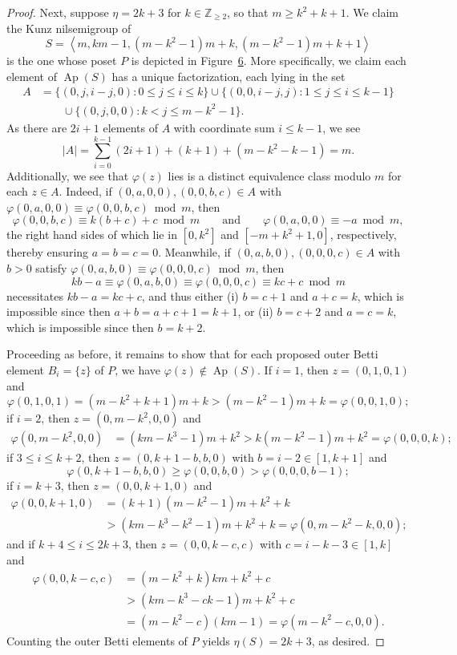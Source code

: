 \documentclass[10pt,a4paper]{amsart}
\newcommand\ZZ{\mathbb{Z}}
\DeclareMathOperator\Ap{Ap}
\begin{document}
\begin{proof}
Next, suppose $\eta = 2k+3$ for $k \in \ZZ_{\ge 2}$, so that $m \ge k^2+k+1$.  We claim the Kunz nilsemigroup of $$S = \left\langle m, km - 1,   (m - k^2-1)m +  k, (m - k^2 -1)m +  k+1\right\rangle$$ is the one whose poset $P$ is depicted in Figure~\href{https://alco.centre-mersenne.org/articles/10.5802/alco.354/}{6}. More specifically, we claim each element of $\Ap(S)$ has a unique factorization, each lying in the set 
\begin{align*}
A &= \{(0, j, i-j, 0) : 0 \le j \le i \le k\}
\cup \{(0, 0, i-j, j): 1 \le j \le i \le k-1\} \\
& \qquad \cup \{(0, j, 0, 0) : k < j \le m - k^2 -1\}.
\end{align*}
As there are $2i+1$ elements of $A$ with coordinate sum $i \leq k-1$, we see
$$|A| = \sum_{i=0}^{k-1} (2i+1) + (k + 1) + (m-k^2-k - 1) = m.$$ Additionally, we see that $\varphi(z)$ lies is a distinct equivalence class modulo $m$ for each $z \in A$. Indeed, if $(0,a,0,0), (0,0,b,c) \in A$ with $\varphi(0,a,0,0) \equiv \varphi(0,0,b,c) \bmod m$, then 
$$\varphi(0,0,b,c) \equiv k(b + c) + c \bmod m
\qquad \text{and} \qquad
\varphi(0,a,0,0) \equiv -a \bmod m,$$
the right hand sides of which lie in $[0, k^2]$ and $[-m + k^2 + 1, 0]$, respectively, thereby ensuring $a = b = c = 0$. Meanwhile, if $(0,a,b,0), (0,0,0,c) \in A$ with $b > 0$ satisfy $\varphi(0,a,b,0) \equiv \varphi(0,0,0,c) \bmod m$, then 
$$kb - a \equiv \varphi(0,a,b,0) \equiv \varphi(0,0,0,c) \equiv kc + c \bmod m$$
necessitates $kb - a = kc + c$, and thus either (i) $b = c + 1$ and $a + c = k$, which is impossible since then $a + b = a + c + 1 = k + 1$, or (ii) $b = c + 2$ and $a = c = k$, which is impossible since then $b = k + 2$.  

Proceeding as before, it remains to show that for each proposed outer Betti element $B_i = \{z\}$ of $P$, we have $\varphi(z) \notin \Ap(S)$.  
If $i = 1$, then $z = (0,1,0,1)$ and
$$\varphi(0,1,0,1) = (m - k^2 + k + 1)m + k > (m - k^2-1)m +  k = \varphi(0,0,1,0);$$
if $i = 2$, then $z = (0,m - k^2,0,0)$ and 
\begin{align*}
    \varphi(0, m - k^2, 0, 0) 
    &= (km - k^3 - 1)m + k^2 
    > k(m-k^2-1)m +  k^2 = \varphi(0, 0, 0, k);
\end{align*}
if $3 \le i \le k + 2$, then $z = (0, k+1-b, b, 0)$ with $b = i - 2 \in [1, k+1]$ and 
$$\varphi(0, k + 1 - b, b, 0) \ge \varphi(0, 0, b, 0) > \varphi(0, 0, 0, b - 1);$$
if $i = k+3$, then $z = (0,0,k+1,0)$ and 
\begin{align*}
    \varphi(0,0, k+1,0) &= (k+1)(m - k^2 - 1)m + k^2 + k\\
    &> (km - k^3 - k^2 - 1)m + k^2 + k = \varphi(0,m-k^2-k,0,0);
\end{align*}
and if $k+4 \le i \le 2k+3$, then $z = (0,0,k-c,c)$ with $c = i - k - 3 \in [1,k]$ and 
\begin{align*}
    \varphi(0,0,k-c,c) &= (m-k^2+k)km + k^2 + c\\
    &> (km - k^3 - ck - 1)m + k^2 + c\\
    &= (m - k^2 - c)(km - 1) = \varphi(m - k^2 - c,0,0).
\end{align*}
Counting the outer Betti elements of $P$ yields $\eta(S) = 2k + 3$, as desired.
\end{proof}
\end{document}
